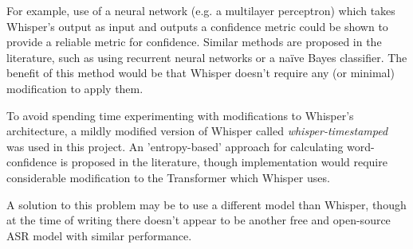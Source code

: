 For example, use of a neural network (e.g. a multilayer perceptron) which takes Whisper's output as input and outputs a confidence metric could be shown to provide a reliable metric for confidence.
Similar methods are proposed in the literature, such as using recurrent neural networks\cite{huang2013predicting, kalgaonkar2015estimating} or a na\"{i}ve Bayes classifier\cite{sanchis2011word}.
The benefit of this method would be that Whisper doesn't require any (or minimal) modification to apply them.

To avoid spending time experimenting with modifications to Whisper's architecture, a mildly modified version of Whisper called \emph{whisper-timestamped}\cite{whisper-timestamped} was used in this project.
An 'entropy-based' approach for calculating word-confidence is proposed in the literature\cite{laptev2023fast, qiu2021learning}, though implementation would require considerable modification to the Transformer which Whisper uses.

A solution to this problem may be to use a different model than Whisper, though at the time of writing there doesn't appear to be another free and open-source ASR model with similar performance.

